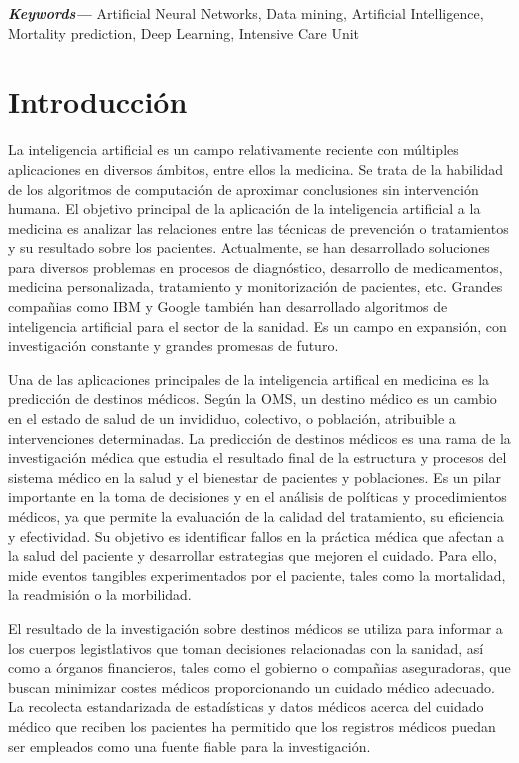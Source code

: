 \documentclass{report}
\providecommand{\keywords}[2]
{
  \small    
  \textbf{\textit{#2---}} #1 
}
\begin{document}
\vspace{5mm} 

\keywords{Artificial Neural Networks, Data mining, Artificial Intelligence, Mortality prediction, Deep Learning, Intensive Care Unit}{Keywords}



\chapter{Introducción}

La inteligencia artificial es un campo relativamente reciente con múltiples aplicaciones en diversos ámbitos, entre ellos la medicina. Se trata de la habilidad de los algoritmos de computación de aproximar conclusiones sin intervención humana. El objetivo principal de la aplicación de la inteligencia artificial a la medicina es analizar las relaciones entre las técnicas de prevención o tratamientos y su resultado sobre los pacientes. Actualmente, se han desarrollado soluciones para diversos problemas en procesos de diagnóstico, desarrollo de medicamentos, medicina personalizada, tratamiento y  monitorización de pacientes, etc. Grandes compañias como IBM y Google también han desarrollado algoritmos de inteligencia artificial para el sector de la sanidad. Es un campo en expansión, con investigación constante y grandes promesas de futuro. 

Una de las aplicaciones principales de la inteligencia artifical en medicina es la predicción de destinos médicos. Según la OMS, un destino médico es un cambio en el estado de salud de un invididuo, colectivo, o población, atribuible a intervenciones determinadas. La predicción de destinos médicos es una rama de la investigación médica que estudia el resultado final de la estructura y procesos del sistema médico en la salud y el bienestar de pacientes y poblaciones. Es un pilar importante en la toma de decisiones y en el análisis de políticas y procedimientos médicos, ya que permite la evaluación de la calidad del tratamiento, su eficiencia y efectividad. Su objetivo es identificar fallos en la práctica médica que afectan a la salud del paciente y desarrollar estrategias que mejoren el cuidado. Para ello, mide eventos tangibles experimentados por el paciente, tales como la mortalidad, la readmisión o la morbilidad.

El resultado de la investigación sobre destinos médicos se utiliza para informar a los cuerpos legistlativos que toman decisiones relacionadas con la sanidad, así como a órganos financieros, tales como el gobierno o compañias aseguradoras, que buscan minimizar costes médicos proporcionando un cuidado médico adecuado. La recolecta estandarizada de estadísticas y datos médicos acerca del cuidado médico que reciben los pacientes ha permitido que los registros médicos puedan ser empleados como una fuente fiable para la investigación.
\end{document}
